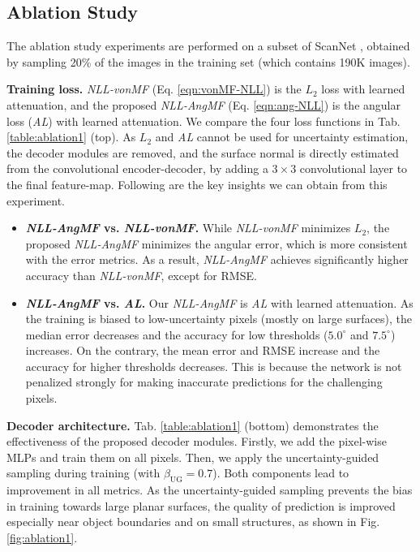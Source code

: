 \documentclass[10pt,twocolumn,letterpaper]{article}
\begin{document}
\subsection{Ablation Study}

The ablation study experiments are performed on a subset of ScanNet \cite{ScanNet}, obtained by sampling 20\% of the images in the training set (which contains 190K images).

\noindent
\textbf{Training loss.} \textit{NLL-vonMF} (Eq. \ref{eqn:vonMF-NLL}) is the $L_2$ loss with learned attenuation, and the proposed \textit{NLL-AngMF} (Eq. \ref{eqn:ang-NLL}) is the angular loss (\textit{AL}) with learned attenuation. We compare the four loss functions in Tab. \ref{table:ablation1} (top). As $L_2$ and \textit{AL} cannot be used for uncertainty estimation, the decoder modules are removed, and the surface normal is directly estimated from the convolutional encoder-decoder, by adding a $3\times 3$ convolutional layer to the final feature-map. Following are the key insights we can obtain from this experiment.

\begin{itemize}
    \item \textbf{\textit{NLL-AngMF} vs. \textit{NLL-vonMF}.} While \textit{NLL-vonMF} minimizes $L_2$, the proposed \textit{NLL-AngMF} minimizes the angular error, which is more consistent with the error metrics. As a result, \textit{NLL-AngMF} achieves significantly higher accuracy than \textit{NLL-vonMF}, except for RMSE.

    \item \textbf{\textit{NLL-AngMF} vs. \textit{AL}.} Our \textit{NLL-AngMF} is \textit{AL} with learned attenuation. As the training is biased to low-uncertainty pixels (mostly on large surfaces), the median error decreases and the accuracy for low thresholds ($5.0^{\circ}$ and $7.5^{\circ}$) increases. On the contrary, the mean error and RMSE increase and the accuracy for higher thresholds decreases. This is because the network is not penalized strongly for making inaccurate predictions for the challenging pixels.
\end{itemize}

\noindent
\textbf{Decoder architecture.} Tab. \ref{table:ablation1} (bottom) demonstrates the effectiveness of the proposed decoder modules. Firstly, we add the pixel-wise MLPs and train them on all pixels. Then, we apply the uncertainty-guided sampling during training (with $\beta_{\text{UG}}\!=\!0.7$). Both components lead to improvement in all metrics. As the uncertainty-guided sampling prevents the bias in training towards large planar surfaces, the quality of prediction is improved especially near object boundaries and on small structures, as shown in Fig. \ref{fig:ablation1}.
\end{document}
